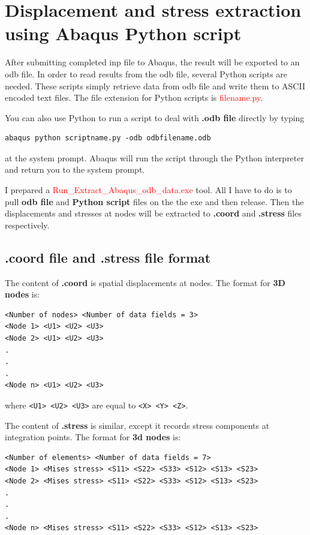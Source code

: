 \documentclass[10pt,a4paper]{article}
\begin{document}
\section{Displacement and stress extraction using Abaqus Python script}
After submitting completed inp file to Abaqus, the result will be exported to an odb file. In order to read results from the odb file, several Python scripts are needed. These scripts simply retrieve data from odb file and write them to ASCII encoded text files. The file extension for Python scripts is \textcolor{red}{filename.py}.

You can also use Python to run a script to deal with \textbf{.odb file} directly by typing 
\begin{lstlisting}
abaqus python scriptname.py -odb odbfilename.odb
\end{lstlisting}
at the system prompt. Abaqus will run the script through the Python interpreter and return you to the system prompt.

I prepared a \textcolor{red}{Run\_Extract\_Abaqus\_odb\_data.exe} tool. All I have to do is to pull \textbf{odb file} and \textbf{Python script} files on the the exe and then release. Then the displacements and stresses at nodes will be extracted to \textbf{.coord} and \textbf{.stress} files respectively.

\subsection{.coord file and .stress file format}
The content of \textbf{.coord} is spatial displacements at nodes. The format for \textbf{3D nodes} is:
\begin{lstlisting}[language={[LaTeX]TeX}]
<Number of nodes> <Number of data fields = 3>
<Node 1> <U1> <U2> <U3>
<Node 2> <U1> <U2> <U3>
.
.
.
<Node n> <U1> <U2> <U3>
\end{lstlisting}

where \lstinline|<U1> <U2> <U3>| are equal to \lstinline|<X> <Y> <Z>|.

The content of \textbf{.stress} is similar, except it records stress components at integration points. The format for \textbf{3d nodes} is:
\begin{lstlisting}[language={[LaTeX]TeX}]
<Number of elements> <Number of data fields = 7>
<Node 1> <Mises stress> <S11> <S22> <S33> <S12> <S13> <S23>
<Node 2> <Mises stress> <S11> <S22> <S33> <S12> <S13> <S23>
.
.
.
<Node n> <Mises stress> <S11> <S22> <S33> <S12> <S13> <S23>
\end{lstlisting}
\end{document}
